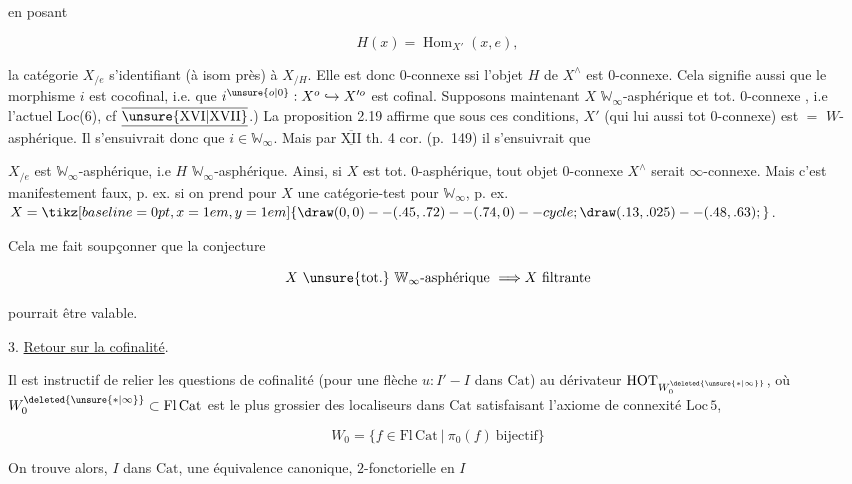en posant

\[
H(x)=\operatorname{Hom}_{X'}(x,e),
\]

la catégorie $X_{/e}$ s'identifiant (à isom près) à $X_{/H}$. Elle est donc $0$-connexe ssi l'objet $H$ de $X^\wedge$ est $0$-connexe. Cela signifie aussi que le morphisme $i$ est cocofinal, i.e. que $i^{\unsure{o|0}}:X^o\hookrightarrow X'^{o}$ est cofinal. Supposons maintenant $X$ $\mathbb W_\infty$-asphérique et tot. $0$-connexe , i.e l'actuel Loc(6), cf $\underline{\overline{\unsure{\mathrm{XVI}|\mathrm{XVII}}}}$.) La proposition 2.19 affirme que sous ces conditions, $X'$ (qui  lui aussi tot $0$-connexe) est $=$ $W$-asphérique. Il s'ensuivrait  donc que $i\in\mathbb W_\infty$. Mais par $\underline{\overline{\mathrm{XII}}}$ th. 4 cor.  (p.~149) il s'ensuivrait que


$X_{/e}$ est $\mathbb W_\infty$-asphérique, i.e $H$ $\mathbb W_\infty$-asphérique. Ainsi, si $X$ est tot. $0$-asphérique, tout objet $0$-connexe  $X^\wedge$ serait $\infty$-connexe. Mais c'est manifestement faux, p. ex. si on prend pour $X$ une catégorie-test pour $\mathbb W_\infty$, p. ex. $X=\mathord{\tikz[baseline=0pt,x=1em,y=1em]{\draw (0,0)--(.45,.72)--(.74,0)--cycle; \draw (.13,.025)--(.48,.63);}}$.

Cela me fait soupçonner que la conjecture

\[
X\ \text{\unsure{tot.}}\ \mathbb W_\infty\text{-asphérique}\ \Longrightarrow X\ \text{filtrante}
\]

pourrait être valable.


3. \uline{Retour sur la cofinalité}.

Il est instructif de relier les questions de cofinalité (pour une flèche $u:I'\mathbin{-}I$ dans $\mathrm{Cat}$) au dérivateur $\mathrm{HOT}_{W^{\deleted{\unsure{*|\infty}}}_0}$, où $W^{\deleted{\unsure{*|\infty}}}_0\subset\mathrm{Fl}\,\mathrm{Cat}$ est le plus grossier des localiseurs dans $\mathrm{Cat}$ satisfaisant l'axiome de connexité $\mathrm{Loc}\,5$,


\[
W_0=\bigl\{f\in\mathrm{Fl}\,\mathrm{Cat}\ \big|\ \pi_0(f)\ \text{bijectif}\bigr\}\tag*{(3.1.)}
\]

On trouve alors,  $I$ dans $\mathrm{Cat}$, une équivalence canonique, $2$-fonctorielle en $I$

